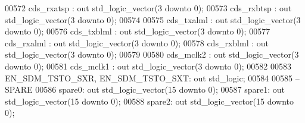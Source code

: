 \begin{DoxyCode}
00572     cds\_rxatsp    : \textcolor{keywordflow}{out} \textcolor{comment}{std\_logic\_vector}(\textcolor{vhdllogic}{}\textcolor{vhdllogic}{3} \textcolor{keywordflow}{downto} \textcolor{vhdllogic}{}\textcolor{vhdllogic}{0});
00573     cds\_rxbtsp    : \textcolor{keywordflow}{out} \textcolor{comment}{std\_logic\_vector}(\textcolor{vhdllogic}{}\textcolor{vhdllogic}{3} \textcolor{keywordflow}{downto} \textcolor{vhdllogic}{}\textcolor{vhdllogic}{0});
00574      
00575     cds\_txalml    : \textcolor{keywordflow}{out} \textcolor{comment}{std\_logic\_vector}(\textcolor{vhdllogic}{}\textcolor{vhdllogic}{3} \textcolor{keywordflow}{downto} \textcolor{vhdllogic}{}\textcolor{vhdllogic}{0});
00576     cds\_txblml    : \textcolor{keywordflow}{out} \textcolor{comment}{std\_logic\_vector}(\textcolor{vhdllogic}{}\textcolor{vhdllogic}{3} \textcolor{keywordflow}{downto} \textcolor{vhdllogic}{}\textcolor{vhdllogic}{0});
00577     cds\_rxalml    : \textcolor{keywordflow}{out} \textcolor{comment}{std\_logic\_vector}(\textcolor{vhdllogic}{}\textcolor{vhdllogic}{3} \textcolor{keywordflow}{downto} \textcolor{vhdllogic}{}\textcolor{vhdllogic}{0});
00578     cds\_rxblml    : \textcolor{keywordflow}{out} \textcolor{comment}{std\_logic\_vector}(\textcolor{vhdllogic}{}\textcolor{vhdllogic}{3} \textcolor{keywordflow}{downto} \textcolor{vhdllogic}{}\textcolor{vhdllogic}{0});
00579 
00580     cds\_mclk2    :  \textcolor{keywordflow}{out} \textcolor{comment}{std\_logic\_vector}(\textcolor{vhdllogic}{}\textcolor{vhdllogic}{3} \textcolor{keywordflow}{downto} \textcolor{vhdllogic}{}\textcolor{vhdllogic}{0});
00581     cds\_mclk1    :  \textcolor{keywordflow}{out} \textcolor{comment}{std\_logic\_vector}(\textcolor{vhdllogic}{}\textcolor{vhdllogic}{3} \textcolor{keywordflow}{downto} \textcolor{vhdllogic}{}\textcolor{vhdllogic}{0});
00582     
00583     EN\_SDM\_TSTO\_SXR, EN\_SDM\_TSTO\_SXT:   \textcolor{keywordflow}{out} \textcolor{comment}{std\_logic};
00584 
00585 \textcolor{keyword}{        -- SPARE}
00586         spare0: \textcolor{keywordflow}{out} \textcolor{comment}{std\_logic\_vector}(\textcolor{vhdllogic}{}\textcolor{vhdllogic}{15} \textcolor{keywordflow}{downto} \textcolor{vhdllogic}{}\textcolor{vhdllogic}{0});
00587         spare1: \textcolor{keywordflow}{out} \textcolor{comment}{std\_logic\_vector}(\textcolor{vhdllogic}{}\textcolor{vhdllogic}{15} \textcolor{keywordflow}{downto} \textcolor{vhdllogic}{}\textcolor{vhdllogic}{0});
00588         spare2: \textcolor{keywordflow}{out} \textcolor{comment}{std\_logic\_vector}(\textcolor{vhdllogic}{}\textcolor{vhdllogic}{15} \textcolor{keywordflow}{downto} \textcolor{vhdllogic}{}\textcolor{vhdllogic}{0});

\end{DoxyCode}
